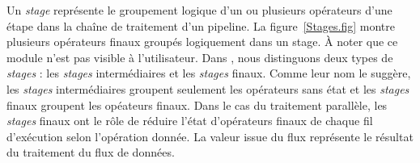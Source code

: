 Un \emph{stage} repr\'esente le groupement logique d'un ou plusieurs op\'erateurs d'une \'etape dans la cha\^ine de traitement d'un pipeline. La figure~\ref{Stages.fig} montre plusieurs op\'erateurs finaux group\'es logiquement dans un stage.  \`A noter que ce module n'est pas visible \`a l'utilisateur. Dans , nous distinguons deux types de \emph{stages} : les \emph{stages} interm\'ediaires et les \emph{stages} finaux. Comme leur nom le sugg\`ere, les \emph{stages} interm\'ediaires groupent seulement les op\'erateurs sans \'etat et les \emph{stages} finaux groupent les op\'eateurs finaux. Dans le cas du traitement parall\`ele, les \emph{stages} finaux ont le r\^ole de r\'eduire l'\'etat d'op\'erateurs finaux de chaque fil d'ex\'ecution selon l'op\'eration donn\'ee. La valeur issue du flux repr\'esente le r\'esultat du traitement du flux de donn\'ees.



